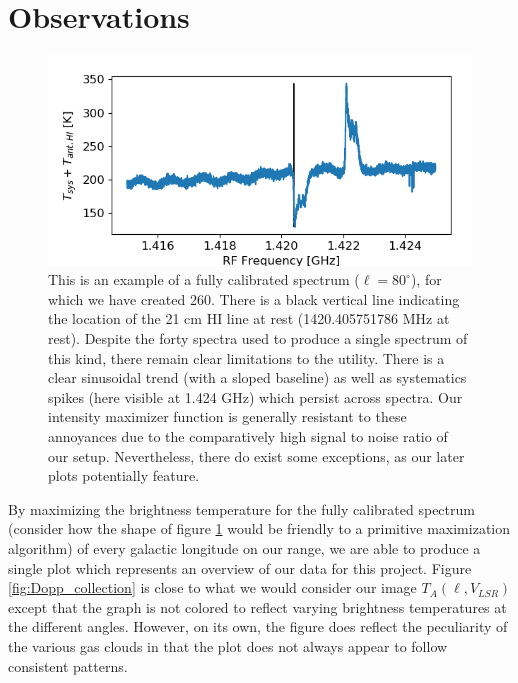 \documentclass[12pt]{article}
\begin{document}
\section{Observations}

\begin{figure}
	\centering
	\includegraphics[width=.8\linewidth]{cal_ex_80_deg}
	\caption{This is an example of a fully calibrated spectrum ($\ell = 80^\circ$), for which we have created 260. There is a black vertical line indicating the location of the 21 cm HI line at rest (1420.405751786 MHz at rest). Despite the forty spectra used to produce a single spectrum of this kind, there remain clear limitations to the utility. There is a clear sinusoidal trend (with a sloped baseline) as well as systematics spikes (here visible at 1.424 GHz) which persist across spectra. Our intensity maximizer function is generally resistant to these annoyances due to the comparatively high signal to noise ratio of our setup. Nevertheless, there do exist some exceptions, as our later plots potentially feature.}
	\label{fig:cal_ex}
\end{figure}

\quad \quad By maximizing the brightness temperature for the fully calibrated spectrum (consider how the shape of figure \ref{fig:cal_ex} would be friendly to a primitive maximization algorithm) of every galactic longitude on our range, we are able to produce a single plot which represents an overview of our data for this project. Figure \ref{fig:Dopp_collection} is close to what we would consider our image $T_A(\ell, V_{LSR})$ except that the graph is not colored to reflect varying brightness temperatures at the different angles. However, on its own, the figure does reflect the peculiarity of the various gas clouds in that the plot does not always appear to follow consistent patterns.
\end{document}
